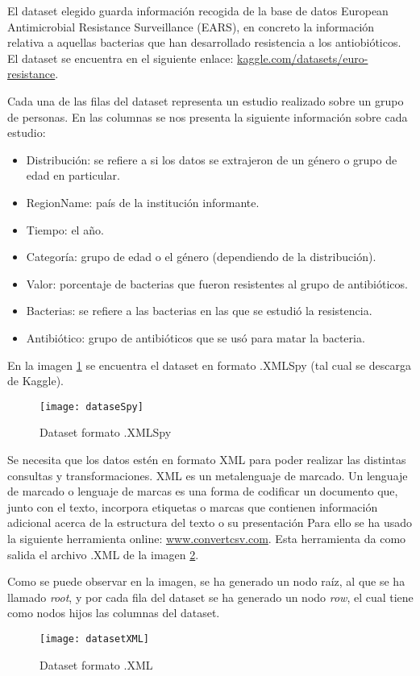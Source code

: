 \documentclass[../main.tex]{subfiles}
\begin{document}
El dataset elegido guarda información recogida de la base de datos  European Antimicrobial Resistance Surveillance (EARS), en concreto la información relativa a aquellas bacterias que han desarrollado resistencia a los antiobióticos. El dataset se encuentra en el siguiente enlace: \href{https://www.kaggle.com/datasets/samfenske/euro-resistance}{kaggle.com/datasets/euro-resistance}. 

Cada una de las filas del dataset representa un estudio realizado sobre un grupo de personas. En las columnas se nos presenta la siguiente información sobre cada estudio:

\begin{itemize}
    \item Distribución: se refiere a si los datos se extrajeron de un género o grupo de edad en particular.
    \item RegionName: país de la institución informante.
    \item Tiempo: el año.
    \item  Categoría: grupo de edad o el género (dependiendo de la distribución).
    \item  Valor: porcentaje de bacterias que fueron resistentes al grupo de antibióticos.
    \item Bacterias: se refiere a las bacterias en las que se estudió la resistencia.
    \item Antibiótico: grupo de antibióticos que se usó para matar la bacteria.
\end{itemize}

En la imagen \ref{datasetSpy} se encuentra el dataset en formato .XMLSpy (tal cual se descarga de Kaggle).

\begin{figure}[ht]
    \centering
    \texttt{[image: dataseSpy]}
    \caption{Dataset formato .XMLSpy}
    \label{datasetSpy}
\end{figure}


Se necesita que los datos estén en formato XML para poder realizar las distintas consultas y transformaciones. XML es un metalenguaje de marcado. Un lenguaje de marcado o lenguaje de marcas es una forma de codificar un documento que, junto con el texto, incorpora etiquetas o marcas que contienen información adicional acerca de la estructura del texto o su presentación Para ello se ha usado la siguiente herramienta online: \href{https://www.convertcsv.com/csv-to-xml.htm}{www.convertcsv.com}. Esta herramienta da como salida el archivo .XML de la imagen \ref{datasetXML}.

Como se puede observar en la imagen, se ha generado un nodo raíz, al que se ha llamado \textit{root}, y por cada fila del dataset se ha generado un nodo \textit{row}, el cual tiene como nodos hijos las columnas del dataset.

\begin{figure}[ht]
    \centering
    \texttt{[image: datasetXML]}
    \caption{Dataset formato .XML}
    \label{datasetXML}
\end{figure}
\end{document}
